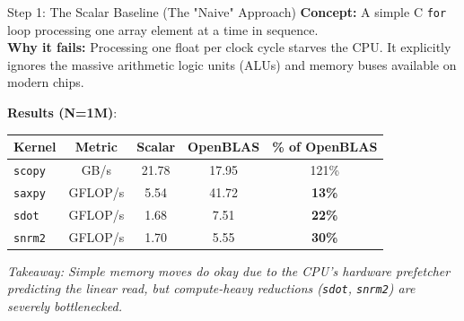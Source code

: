 \documentclass{beamer}
\begin{document}
\begin{frame}{Step 1: The Scalar Baseline (The "Naive" Approach)}
    \textbf{Concept:} A simple C \texttt{for} loop processing one array element at a time in sequence. \\
    \vspace{0.2cm}
    \textbf{Why it fails:} Processing one float per clock cycle starves the CPU. It explicitly ignores the massive arithmetic logic units (ALUs) and memory buses available on modern chips.
    \vspace{0.2cm}
    
    \textbf{Results (N=1M)}:
    \begin{table}[]
    \centering
    \begin{tabular}{@{}l|c|cc|c@{}}
    \toprule
    \textbf{Kernel} & \textbf{Metric}  & \textbf{Scalar} & \textbf{OpenBLAS} & \textbf{\% of OpenBLAS} \\ \midrule
    \texttt{scopy}  & GB/s             & 21.78           & 17.95             & 121\%                   \\
    \texttt{saxpy}  & GFLOP/s          & 5.54            & 41.72             & \textbf{13\%}           \\
    \texttt{sdot}   & GFLOP/s          & 1.68            & 7.51              & \textbf{22\%}           \\
    \texttt{snrm2}  & GFLOP/s          & 1.70            & 5.55              & \textbf{30\%}           \\ \bottomrule
    \end{tabular}
    \end{table}
    
    \textit{Takeaway: Simple memory moves do okay due to the CPU's hardware prefetcher predicting the linear read, but compute-heavy reductions (\texttt{sdot}, \texttt{snrm2}) are severely bottlenecked.}
\end{frame}
\end{document}
